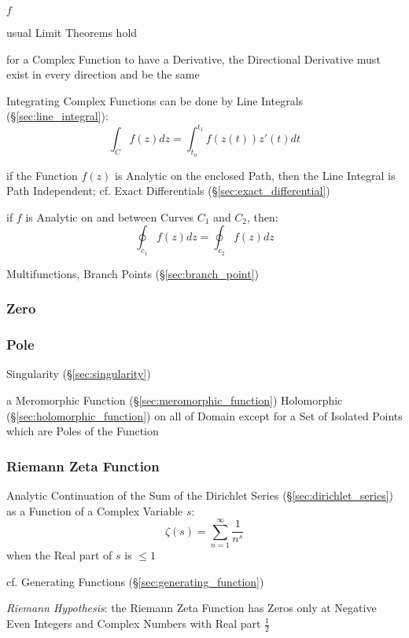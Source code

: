 $f$

usual Limit Theorems hold

for a Complex Function to have a Derivative, the Directional Derivative must
exist in every direction and be the same

Integrating Complex Functions can be done by Line Integrals
(\S\ref{sec:line_integral}):
\[
  \int_{C} f(z) dz = \int_{t_0}^{t_1} f(z(t)) z'(t) dt
\]

if the Function $f(z)$ is Analytic on the enclosed Path, then the Line Integral
is Path Independent; cf. Exact Differentials (\S\ref{sec:exact_differential})

if $f$ is Analytic on and between Curves $C_1$ and $C_2$, then:
\[
  \oint_{c_1} f(z) dz = \oint_{c_2} f(z) dz
\]

Multifunctions, Branch Points (\S\ref{sec:branch_point})



\subsubsection{Zero}\label{sec:complex_zero}

\subsubsection{Pole}\label{sec:complex_pole}

Singularity (\S\ref{sec:singularity})

a Meromorphic Function (\S\ref{sec:meromorphic_function}) Holomorphic
(\S\ref{sec:holomorphic_function}) on all of Domain except for a Set of
Isolated Points which are Poles of the Function



\subsubsection{Riemann Zeta Function}\label{sec:riemann_zeta}

Analytic Continuation of the Sum of the Dirichlet Series
(\S\ref{sec:dirichlet_series}) as a Function of a Complex Variable $s$:
\[
  \zeta(s) = \sum_{n=1}^\infty \frac{1}{n^s}
\]
when the Real part of $s$ is $\leq 1$

\fist cf. Generating Functions (\S\ref{sec:generating_function})

\emph{Riemann Hypothesis}: the Riemann Zeta Function has Zeros only at Negative
Even Integers and Complex Numbers with Real part $\frac{1}{2}$

